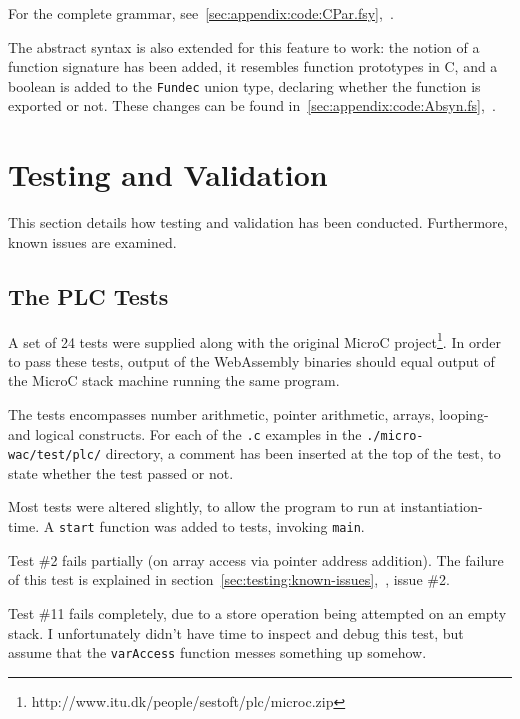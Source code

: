 \documentclass[a4paper]{article}
\begin{document}
For the complete grammar, see~\ref{sec:appendix:code:CPar.fsy},~.

The abstract syntax is also extended for this feature to work: the notion of a function signature has been added, it resembles function prototypes in C, and a boolean is added to the \texttt{Fundec} union type, declaring whether the function is exported or not. These changes can be found in~\ref{sec:appendix:code:Absyn.fs},~.



\section{Testing and Validation}
\label{sec:testing}
This section details how testing and validation has been conducted. Furthermore, known issues are examined.

\subsection{The PLC Tests}
\label{sec:testing:plc}
A set of 24 tests were supplied along with the original MicroC project\footnote{http://www.itu.dk/people/sestoft/plc/microc.zip}. In order to pass these tests, output of the WebAssembly binaries should equal output of the MicroC stack machine running the same program.

The tests encompasses number arithmetic, pointer arithmetic, arrays, looping- and logical constructs. For each of the \texttt{.c} examples in the \texttt{./micro-wac/test/plc/} directory, a comment has been inserted at the top of the test, to state whether the test passed or not.

Most tests were altered slightly, to allow the program to run at instantiation-time. A \texttt{start} function was added to tests, invoking \texttt{main}.

Test \#2 fails partially (on array access via pointer address addition). The failure of this test is explained in section~\ref{sec:testing:known-issues},~, issue \#2.

Test \#11 fails completely, due to a store operation being attempted on an empty stack. I unfortunately didn't have time to inspect and debug this test, but assume that the \texttt{varAccess} function messes something up somehow.
\end{document}
